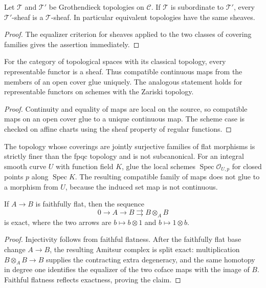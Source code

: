 \begin{proposition}\label{fga-pro-2-49}
Let $\mathcal T$ and $\mathcal T'$ be Grothendieck topologies on $\mathcal C$.
If $\mathcal T$ is subordinate to $\mathcal T'$, every $\mathcal T'$-sheaf is a
$\mathcal T$-sheaf.  In particular equivalent topologies have the same sheaves.
\end{proposition}
\begin{proof}
The equalizer criterion for sheaves applied to the two classes of covering
families gives the assertion immediately.
\end{proof}

\begin{proposition}\label{fga-pro-2-54}\uses{}
For the category of topological spaces with its classical topology, every
representable functor is a sheaf.  Thus compatible continuous maps from the
members of an open cover glue uniquely.  The analogous statement holds for
representable functors on schemes with the Zariski topology.
\end{proposition}
\begin{proof}
Continuity and equality of maps are local on the source, so compatible maps on
an open cover glue to a unique continuous map.  The scheme case is checked on
affine charts using the sheaf property of regular functions.
\end{proof}

\begin{remark}\label{fga-rem-2-56}\uses{}
The topology whose coverings are jointly surjective families of flat morphisms
is strictly finer than the fpqc topology and is not subcanonical.  For an
integral smooth curve $U$ with function field $K$, glue the local schemes
$\operatorname{Spec}\mathcal O_{U,p}$ for closed points $p$ along
$\operatorname{Spec}K$.  The resulting compatible family of maps does not glue
to a morphism from $U$, because the induced set map is not continuous.
\end{remark}

\begin{lemma}\label{fga-lem-2-61}
If $A\to B$ is faithfully flat, then the sequence
\[
0\longrightarrow A\longrightarrow B\rightrightarrows B\otimes_A B
\]
is exact, where the two arrows are $b\mapsto b\otimes1$ and
$b\mapsto1\otimes b$.
\end{lemma}
\begin{proof}
Injectivity follows from faithful flatness.  After the faithfully flat base
change $A\to B$, the resulting Amitsur complex is split exact: multiplication
$B\otimes_A B\to B$ supplies the contracting extra degeneracy, and the same
homotopy in degree one identifies the equalizer of the two coface maps with
the image of $B$.  Faithful flatness reflects exactness, proving the claim.
\end{proof}
